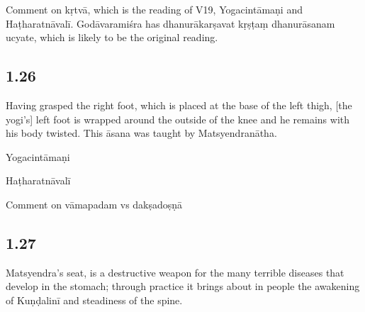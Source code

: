 \begin{ekdosis}
\begin{testimonia}[hp01_025]
\end{testimonia}

\begin{philcomm}[hp01_025]
Comment on kṛtvā, which is the reading of V19, Yogacintāmaṇi and Haṭharatnāvalī.
Godāvaramiśra has dhanurākarṣavat kṛṣṭaṃ dhanurāsanam ucyate, which is likely to be the original reading.
\end{philcomm}

\subsection*{1.26}
\begin{translation}[hp01_026]
Having grasped the right foot, which is placed at the base of the left thigh, [the yogi’s] left foot is wrapped around the outside of the knee and he remains with his body twisted. This āsana was taught by Matsyendranātha.
\end{translation}

\begin{testimonia}[hp01_026]
Yogacintāmaṇi

\begin{versinnote}
\end{versinnote}

Haṭharatnāvalī

\begin{versinnote}
\end{versinnote}

\end{testimonia}

\begin{philcomm}[hp01_026]
Comment on vāmapadam vs dakṣadoṣṇā
\end{philcomm}

\subsection*{1.27}
\begin{translation}[hp01_027]
Matsyendra's seat, is a destructive weapon for the many terrible diseases that develop in the stomach; through practice it brings about in people the awakening of Kuṇḍalinī and steadiness of the spine.
\end{translation}


\end{ekdosis}
